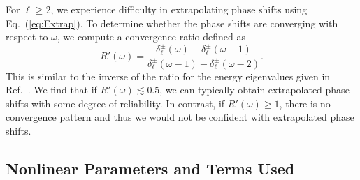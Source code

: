 \documentclass[preprint,showpacs,showkeys,preprintnumbers,amsmath,amssymb,longbibliography,pra,aps]{revtex4-1}
\begin{document}
{For $\ell \geq 2$, we experience difficulty in extrapolating phase shifts
using Eq.~(\ref{eq:Extrap}). To determine whether the phase shifts are
converging with respect to $\omega$, we compute a convergence ratio defined as
\begin{equation}
\label{eq:ConvRatio}
R'(\omega) = \frac{\delta_\ell^\pm(\omega)-\delta_\ell^\pm(\omega-1)}
  {\delta_\ell^\pm(\omega-1)-\delta_\ell^\pm(\omega-2)}.
\end{equation}
This is similar to the inverse of the ratio for the energy eigenvalues given in
Ref.~\cite{Yan1999}. We find that if $R'(\omega) \lesssim 0.5$, we can
typically
obtain extrapolated phase shifts with some degree of reliability. In contrast,
if $R'(\omega) \geq 1$, there is no convergence pattern and thus we would not
be confident with extrapolated phase shifts.


\subsection{Nonlinear Parameters and Terms Used}
\label{sec:Parameters}


}
\end{document}
